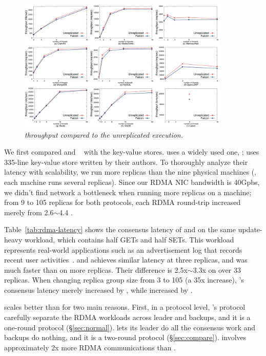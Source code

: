 \begin{figure}[t]
\centering
\includegraphics[width=0.9\textwidth]{figures/throughput}
\vspace{-.10in}
\caption{\small {\em \xxx throughput compared to the unreplicated
execution.}}
\vspace{-.20in}
\label{fig:tput}
\end{figure}

We first compared \xxx and \dare~\cite{dare:hpdc15} with the key-value 
stores. \xxx uses a widely used one, \redis; \dare uses 335-line key-value 
store written by their authors. To thoroughly analyze their latency with 
scalability, we run more replicas than the nine physical machines (\ie, each 
machine runs several replicas). Since our RDMA NIC bandwidth is 40Gpbs, we 
didn't find network a bottleneck when running more replicas on a machine; from 9 
to 105 replicas for both protocols, each RDMA round-trip increased merely from 
2.6$\sim$4.4 \us.

Table~\ref{tab:rdma-latency} shows the consensus latency of \xxx and 
\dare on the same update-heavy workload, which contains half GETs and half 
SETs. This workload represents real-world applications such as an advertisement 
log that records recent user activities~\cite{dare:hpdc15}. \xxx and \dare 
achieves similar latency at three replicas, and \xxx was much faster than \dare 
on more replicas. Their difference is 2.5x$\sim$3.3x on over 33 replicas. When 
changing replica group size from 3 to 105 (a 35x increase), \xxx's consensus 
latency merely increased by \xxxscalability, while \dare increased by 
\darescalability.

\xxx scales better than \dare for two main reasons. First, in a protocol level, 
\xxx's protocol carefully separate the RDMA workloads across leader and 
backups, and it is a one-round protocol (\S\ref{sec:normal}). \dare lets its 
leader do all the consensus work and backups do nothing, and it is a two-round 
protocol (\S\ref{sec:compare}). \dare involves approximately 2x more RDMA 
communications than \xxx.

